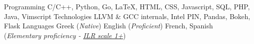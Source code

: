 

\begin{cvskills}

  \cvskill
    {Programming}
        {C/C++, Python, Go, \LaTeX, HTML, CSS, Javascript, SQL, PHP, Java, Vimscript}
  \cvskill
    {Technologies} %
		{LLVM \& GCC internals, Intel PIN, Pandas, Bokeh, Flask} %
  \cvskill
    {Languages} %
    {Greek (\textit{Native}) \hspace*{7pt} English (\textit{Proficient}) \hspace*{7pt}  French, Spanish (\textit{Elementary proficiency - \href{http://www.govtilr.org/skills/ILRscale1.htm}{ILR scale 1+}})}

\end{cvskills}
